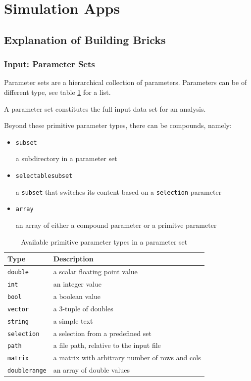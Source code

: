 \section{Simulation Apps}

\subsection{Explanation of Building Bricks}

\subsubsection{Input: Parameter Sets}

Parameter sets are a hierarchical collection of parameters. Parameters can be of different type, see table \ref{tab:parameters} for a list.

A parameter set constitutes the full input data set for an analysis.

Beyond these primitive parameter types, there can be compounds, namely:
\begin{itemize}
\item \texttt{subset}

a subdirectory in a parameter set

\item \texttt{selectablesubset}

a \texttt{subset} that switches its content based on a \texttt{selection} parameter

\item \texttt{array}

an array of either a compound parameter or a primitve parameter
\end{itemize}

\begin{table}[h!]
\centering
\begin{tabular}{ll}
\hline
Type & Description \\
\hline\hline
\texttt{double} & a scalar floating point value\\
\texttt{int} & an integer value\\
\texttt{bool} & a boolean value\\
\texttt{vector} & a 3-tuple of doubles\\
\texttt{string} & a simple text\\
\texttt{selection} & a selection from a predefined set\\
\texttt{path} & a file path, relative to the input file\\
\texttt{matrix} & a matrix with arbitrary number of rows and cols\\
\texttt{doublerange} & an array of double values\\
\hline
\end{tabular}
\caption{Available primitive parameter types in a parameter set}
\label{tab:parameters}
\end{table}

